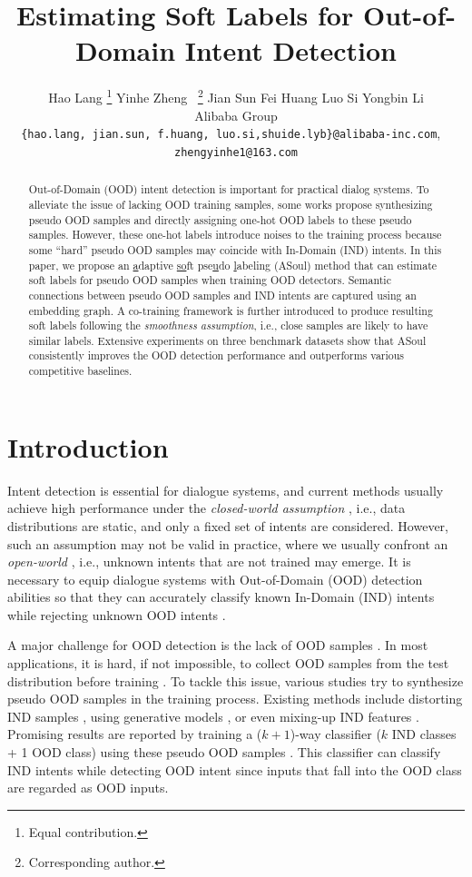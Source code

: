 \documentclass[11pt]{article}
\title{Estimating Soft Labels for Out-of-Domain Intent Detection}
\author{
Hao Lang \thanks{\quad Equal contribution.} \quad 
Yinhe Zheng \footnotemark[1] \ \thanks{\quad Corresponding author.} \quad 
Jian Sun \quad 
Fei Huang \quad 
Luo Si \quad 
Yongbin Li \footnotemark[2] \\
  Alibaba Group \\
    \texttt{\{hao.lang, jian.sun, f.huang, luo.si,shuide.lyb\}@alibaba-inc.com}, \ \\  \texttt{zhengyinhe1@163.com}  \\}
\begin{document}
\maketitle
\begin{abstract}

Out-of-Domain (OOD) intent detection is important for practical dialog systems. To alleviate the issue of lacking OOD training samples, some works propose synthesizing pseudo OOD samples and directly assigning one-hot OOD labels to these pseudo samples. However, these one-hot labels introduce noises to the training process because some ``hard'' pseudo OOD samples may coincide with In-Domain (IND) intents. In this paper, we propose an \underline{a}daptive \underline{so}ft pse\underline{u}do \underline{l}abeling (ASoul) method that can estimate soft labels for pseudo OOD samples when training OOD detectors. Semantic connections between pseudo OOD samples and IND intents are captured using an embedding graph. A co-training framework is further introduced to produce resulting soft labels following the \emph{smoothness assumption}, i.e., close samples are likely to have similar labels. Extensive experiments on three benchmark datasets show that ASoul consistently improves the OOD detection performance and outperforms various competitive baselines.
\end{abstract}

\section{Introduction}

Intent detection is essential for dialogue systems, and current methods usually achieve high performance under the \textit{closed-world assumption} \cite{shu2017doc}, i.e., data distributions are static, and only a fixed set of intents are considered. However, such an assumption may not be valid in practice, where we usually confront an \textit{open-world} \citep{fei2016breaking}, i.e., unknown intents that are not trained may emerge. It is necessary to equip dialogue systems with Out-of-Domain (OOD) detection abilities so that they can accurately classify known In-Domain (IND) intents while rejecting unknown OOD intents \cite{yan-etal-2020-unknown,shen2021enhancing}.

A major challenge for OOD detection is the lack of OOD samples \cite{xu2020deep}. In most applications, it is hard, if not impossible, to collect OOD samples from the test distribution before training \cite{du2021vos}. To tackle this issue, various studies try to synthesize pseudo OOD samples in the training process. Existing methods include distorting IND samples \cite{choi2021outflip,shu2021odist,ouyang2021energy}, using generative models \cite{ryu-etal-2018-domain,zheng2020out}, or even mixing-up IND features \cite{zhou2021learning,zhan2021out}. Promising results are reported by training a ($k+1$)-way classifier ($k$ IND classes + 1 OOD class) using these pseudo OOD samples \cite{geng2020recent}. This classifier can classify IND intents while detecting OOD intent since inputs that fall into the OOD class are regarded as OOD inputs.
\end{document}
